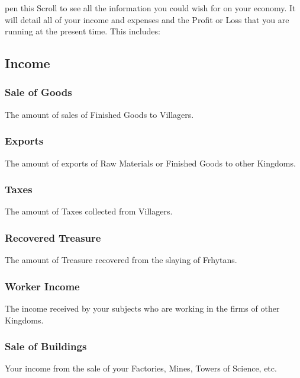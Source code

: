 
pen this Scroll to see all the information you could wish for on your economy. It will detail all of your income and expenses and the Profit or Loss that you are running at the present time. This includes:

\subsection{Income}


\subsubsection{Sale of Goods}

The amount of sales of Finished Goods to Villagers.

\subsubsection{Exports}

The amount of exports of Raw Materials or Finished Goods to other Kingdoms.

\subsubsection{Taxes}

The amount of Taxes collected from Villagers.

\subsubsection{Recovered Treasure}

The amount of Treasure recovered from the slaying of Frhytans.

\subsubsection{Worker Income}

The income received by your subjects who are working in the firms of other Kingdoms.

\subsubsection{Sale of Buildings}

Your income from the sale of your Factories, Mines, Towers of Science, etc.

